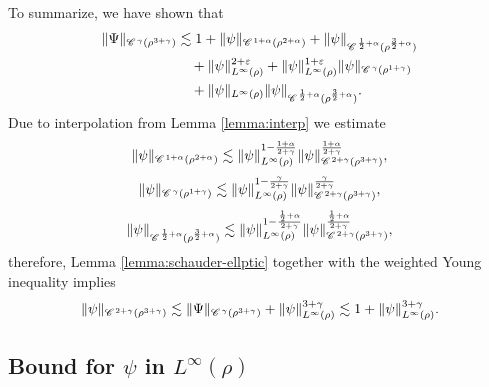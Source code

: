 \documentclass[a4paper,11pt]{article}
\numberwithin{equation}{section}
\newcommand{\CC}{\mathscr{C} \hspace{.1em}}
\newcommand{\8}{\infty}
\begin{document}
To summarize, we have shown that
\begin{align*}
\|\Psi\|_{\CC^{\gamma}(\rho^{3+\gamma})}
&\lesssim 1+ \|\psi\|_{\CC^{1+\alpha}(\rho^{2+\alpha})} +\|\psi\|_{\CC^{\frac{1}{2}+\alpha}(\rho^{\frac{3}{2}+\alpha})}
\\
&\quad +\|\psi\|^{2+\varepsilon}_{L^\infty(\rho)} 
+\|\psi\|^{1+\varepsilon}_{L^\infty(\rho)}\|\psi\|_{\CC^{\gamma}(\rho^{1+\gamma})}\\
&\quad +\|\psi\|_{L^\infty(\rho)}\|\psi\|_{\CC^{\frac{1}{2}+\alpha}(\rho^{\frac{3}{2}+\alpha})}.
\end{align*}
Due to interpolation from Lemma \ref{lemma:interp} we estimate
\begin{align*}
\|\psi\|_{\CC^{1+\alpha}(\rho^{2+\alpha})}\lesssim \|\psi\|^{1-\frac{1+\alpha}{2+\gamma}}_{L^\infty(\rho)} \|\psi\|^\frac{1+\alpha}{2+\gamma}_{\CC^{2+\gamma}(\rho^{3+\gamma})},
\end{align*}
\begin{align*}
\|\psi\|_{\CC^{\gamma}(\rho^{1+\gamma})}\lesssim \|\psi\|^{1-\frac{\gamma}{2+\gamma}}_{L^\infty(\rho)} \|\psi\|^\frac{\gamma}{2+\gamma}_{\CC^{2+\gamma}(\rho^{3+\gamma})},
\end{align*}
\begin{align*}
\|\psi\|_{\CC^{\frac{1}{2}+\alpha}(\rho^{\frac{3}{2}+\alpha})}\lesssim \|\psi\|^{1-\frac{\frac{1}{2}+\alpha}{2+\gamma}}_{L^\infty(\rho)} \|\psi\|^{\frac{\frac{1}{2}+\alpha}{2+\gamma}}_{\CC^{2+\gamma}(\rho^{3+\gamma})},
\end{align*}
therefore,  Lemma \ref{lemma:schauder-ellptic} together with the weighted Young inequality implies
\begin{align}\label{eq:97}
\|\psi\|_{\CC^{2+\gamma}(\rho^{3+\gamma})}\lesssim \|\Psi\|_{\CC^{\gamma}(\rho^{3+\gamma})}+\|\psi\|^{3+\gamma}_{L^\infty(\rho)} \lesssim 1 +\|\psi\|^{3+\gamma}_{L^\infty(\rho)} .
\end{align}

\subsection{Bound for $\psi$ in $L^\infty(\rho)$}
\label{ssec:psi2}
\end{document}
